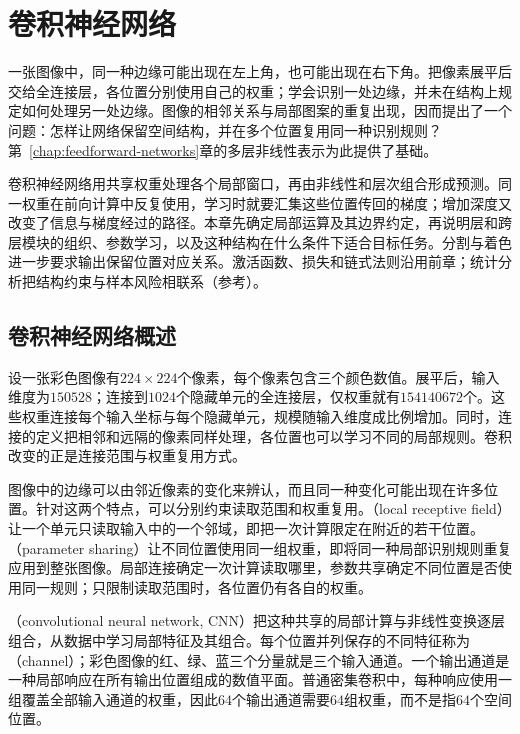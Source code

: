 \chapter{卷积神经网络}
\label{chap:convolutional-networks}

一张图像中，同一种边缘可能出现在左上角，也可能出现在右下角。把像素展平后交给全连接层，各位置分别使用自己的权重；学会识别一处边缘，并未在结构上规定如何处理另一处边缘。图像的相邻关系与局部图案的重复出现，因而提出了一个问题：怎样让网络保留空间结构，并在多个位置复用同一种识别规则？第~\ref{chap:feedforward-networks}章的多层非线性表示为此提供了基础。

卷积神经网络用共享权重处理各个局部窗口，再由非线性和层次组合形成预测。同一权重在前向计算中反复使用，学习时就要汇集这些位置传回的梯度；增加深度又改变了信息与梯度经过的路径。本章先确定局部运算及其边界约定，再说明层和跨层模块的组织、参数学习，以及这种结构在什么条件下适合目标任务。分割与着色进一步要求输出保留位置对应关系。激活函数、损失和链式法则沿用前章；统计分析把结构约束与样本风险相联系（参考）。

\section{卷积神经网络概述}
\label{sec:cnn-overview}

设一张彩色图像有$224\times224$个像素，每个像素包含三个颜色数值。展平后，输入维度为$150528$；连接到$1024$个隐藏单元的全连接层，仅权重就有$154140672$个。这些权重连接每个输入坐标与每个隐藏单元，规模随输入维度成比例增加。同时，连接的定义把相邻和远隔的像素同样处理，各位置也可以学习不同的局部规则。卷积改变的正是连接范围与权重复用方式。

图像中的边缘可以由邻近像素的变化来辨认，而且同一种变化可能出现在许多位置。针对这两个特点，可以分别约束读取范围和权重复用。（local receptive field）让一个单元只读取输入中的一个邻域，即把一次计算限定在附近的若干位置。（parameter sharing）让不同位置使用同一组权重，即将同一种局部识别规则重复应用到整张图像。局部连接确定一次计算读取哪里，参数共享确定不同位置是否使用同一规则；只限制读取范围时，各位置仍有各自的权重。

（convolutional neural network, CNN）把这种共享的局部计算与非线性变换逐层组合，从数据中学习局部特征及其组合。每个位置并列保存的不同特征称为（channel）；彩色图像的红、绿、蓝三个分量就是三个输入通道。一个输出通道是一种局部响应在所有输出位置组成的数值平面。普通密集卷积中，每种响应使用一组覆盖全部输入通道的权重，因此$64$个输出通道需要$64$组权重，而不是指$64$个空间位置。

